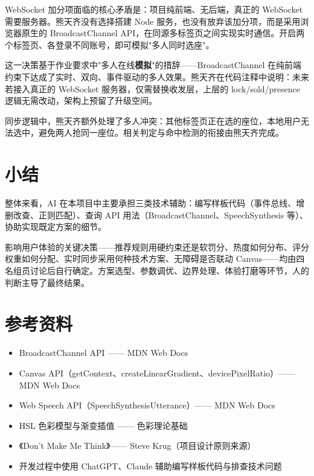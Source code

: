 \documentclass[12pt,a4paper]{ctexart}
\begin{document}
WebSocket 加分项面临的核心矛盾是：项目纯前端、无后端，真正的 WebSocket 需要服务器。熊天齐没有选择搭建 Node 服务，也没有放弃该加分项，而是采用浏览器原生的 BroadcastChannel API，在同源多标签页之间实现实时通信。开启两个标签页、各登录不同账号，即可模拟"多人同时选座"。

这一决策基于作业要求中"多人在线\textbf{模拟}"的措辞——BroadcastChannel 在纯前端约束下达成了实时、双向、事件驱动的多人效果。熊天齐在代码注释中说明：未来若接入真正的 WebSocket 服务器，仅需替换收发层，上层的 lock/sold/presence 逻辑无需改动，架构上预留了升级空间。

同步逻辑中，熊天齐额外处理了多人冲突：其他标签页正在选的座位，本地用户无法选中，避免两人抢同一座位。相关判定与命中检测的衔接由熊天齐完成。

\section{小结}

整体来看，AI 在本项目中主要承担三类技术辅助：编写样板代码（事件总线、增删改查、正则匹配）、查询 API 用法（BroadcastChannel、SpeechSynthesis 等）、协助实现既定方案的细节。

影响用户体验的关键决策——推荐规则用硬约束还是软罚分、热度如何分布、评分权重如何分配、实时同步采用何种技术方案、无障碍是否联动 Canvas——均由四名组员讨论后自行确定。方案选型、参数调优、边界处理、体验打磨等环节，人的判断主导了最终结果。

\section{参考资料}

\begin{itemize}
  \item BroadcastChannel API —— MDN Web Docs
  \item Canvas API（getContext、createLinearGradient、devicePixelRatio）—— MDN Web Docs
  \item Web Speech API（SpeechSynthesisUtterance）—— MDN Web Docs
  \item HSL 色彩模型与渐变插值 —— 色彩理论基础
  \item 《Don't Make Me Think》—— Steve Krug（项目设计原则来源）
  \item 开发过程中使用 ChatGPT、Claude 辅助编写样板代码与排查技术问题
\end{itemize}
\end{document}
